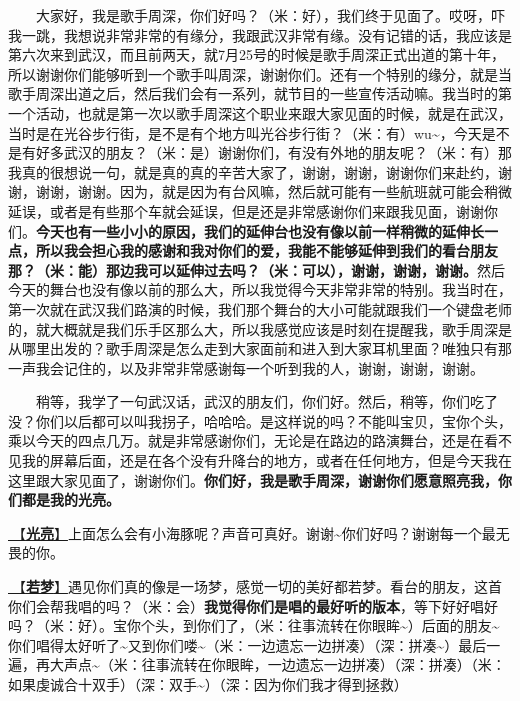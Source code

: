 \documentclass[]{ctexbook}
\begin{document}
  大家好，我是歌手周深，你们好吗？（米：好），我们终于见面了。哎呀，吓我一跳，我想说非常非常的有缘分，我跟武汉非常有缘。没有记错的话，我应该是第六次来到武汉，而且前两天，就7月25号的时候是歌手周深正式出道的第十年，所以谢谢你们能够听到一个歌手叫周深，谢谢你们。还有一个特别的缘分，就是当歌手周深出道之后，然后我们会有一系列，就节目的一些宣传活动嘛。我当时的第一个活动，也就是第一次以歌手周深这个职业来跟大家见面的时候，就是在武汉，当时是在光谷步行街，是不是有个地方叫光谷步行街？（米：有）wu\textasciitilde，今天是不是有好多武汉的朋友？（米：是）谢谢你们，有没有外地的朋友呢？（米：有）那我真的很想说一句，就是真的真的辛苦大家了，谢谢，谢谢，谢谢你们来赴约，谢谢，谢谢，谢谢。因为，就是因为有台风嘛，然后就可能有一些航班就可能会稍微延误，或者是有些那个车就会延误，但是还是非常感谢你们来跟我见面，谢谢你们。\textbf{今天也有一些小小的原因，我们的延伸台也没有像以前一样稍微的延伸长一点，所以我会担心我的感谢和我对你们的爱，我能不能够延伸到我们的看台朋友那？（米：能）那边我可以延伸过去吗？（米：可以），谢谢，谢谢，谢谢。}然后今天的舞台也没有像以前的那么大，所以我觉得今天非常非常的特别。我当时在，第一次就在武汉我们路演的时候，我们那个舞台的大小可能就跟我们一个键盘老师的，就大概就是我们乐手区那么大，所以我感觉应该是时刻在提醒我，歌手周深是从哪里出发的？歌手周深是怎么走到大家面前和进入到大家耳机里面？唯独只有那一声我会记住的，以及非常非常感谢每一个听到我的人，谢谢，谢谢，谢谢。

  稍等，我学了一句武汉话，武汉的朋友们，你们好。然后，稍等，你们吃了没？你们以后都可以叫我拐子，哈哈哈。是这样说的吗？不能叫宝贝，宝你个头，乘以今天的四点几万。就是非常感谢你们，无论是在路边的路演舞台，还是在看不见我的屏幕后面，还是在各个没有升降台的地方，或者在任何地方，但是今天我在这里跟大家见面了，谢谢你们。\textbf{你们好，我是歌手周深，谢谢你们愿意照亮我，你们都是我的光亮。}

\hyperref[silver-linings]{🎵【\textbf{光亮}】}上面怎么会有小海豚呢？声音可真好。谢谢\textasciitilde 你们好吗？谢谢每一个最无畏的你。

\hyperref[ruomeng]{🎵【\textbf{若梦}】}遇见你们真的像是一场梦，感觉一切的美好都若梦。看台的朋友，这首你们会帮我唱的吗？（米：会）\textbf{我觉得你们是唱的最好听的版本}，等下好好唱好吗？（米：好）。宝你个头，到你们了，（米：往事流转在你眼眸\textasciitilde）后面的朋友\textasciitilde 你们唱得太好听了\textasciitilde 又到你们喽\textasciitilde（米：一边遗忘一边拼凑）（深：拼凑\textasciitilde）最后一遍，再大声点\textasciitilde（米：往事流转在你眼眸，一边遗忘一边拼凑）（深：拼凑）（米：如果虔诚合十双手）（深：双手\textasciitilde）（深：因为你们我才得到拯救）
\end{document}

